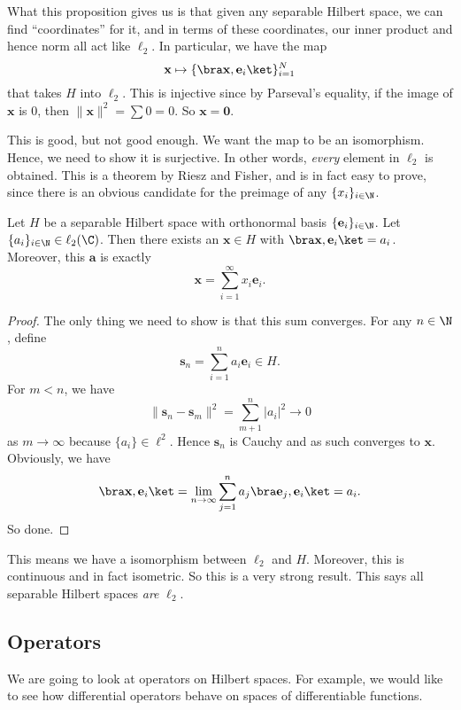 \documentclass[a4paper]{article}
\begin{document}
What this proposition gives us is that given any separable Hilbert space, we can find ``coordinates'' for it, and in terms of these coordinates, our inner product and hence norm all act like $\ell_2$. In particular, we have the map
\[
  \mathbf{x} \mapsto \{\bra \mathbf{x}, \mathbf{e}_i\ket \}_{i = 1}^N
\]
that takes $H$ into $\ell_2$. This is injective since by Parseval's equality, if the image of $\mathbf{x}$ is $0$, then $\|\mathbf{x}\|^2 = \sum 0 = 0$. So $\mathbf{x} = \mathbf{0}$.

This is good, but not good enough. We want the map to be an isomorphism. Hence, we need to show it is surjective. In other words, \emph{every} element in $\ell_2$ is obtained. This is a theorem by Riesz and Fisher, and is in fact easy to prove, since there is an obvious candidate for the preimage of any $\{x_i\}_{i \in \N}$.

\begin{prop}
  Let $H$ be a separable Hilbert space with orthonormal basis $\{\mathbf{e}_i\}_{i \in \N}$. Let $\{a_i\}_{i \in \N} \in \ell_2(\C)$. Then there exists an $\mathbf{x} \in H$ with $\bra \mathbf{x}, \mathbf{e}_i \ket = a_i$. Moreover, this $\mathbf{a}$ is exactly
  \[
    \mathbf{x} = \sum_{i = 1}^\infty x_i \mathbf{e}_i.
  \]
\end{prop}

\begin{proof}
  The only thing we need to show is that this sum converges. For any $n \in \N$, define
  \[
    \mathbf{s}_n = \sum_{i = 1}^n a_i \mathbf{e}_i \in H.
  \]
  For $m < n$, we have
  \[
    \|\mathbf{s}_n - \mathbf{s}_m\|^2 = \sum_{m + 1}^n |a_i|^2 \to 0
  \]
  as $m \to \infty$ because $\{a_i\} \in \ell^2$. Hence $\mathbf{s}_n$ is Cauchy and as such converges to $\mathbf{x}$. Obviously, we have
  \[
    \bra \mathbf{x}, \mathbf{e}_i\ket = \lim_{n \to \infty} \sum_{j = 1}^n a_j \bra \mathbf{e}_j, \mathbf{e}_i \ket = a_i.
  \]
  So done.
\end{proof}
This means we have a isomorphism between $\ell_2$ and $H$. Moreover, this is continuous and in fact isometric. So this is a very strong result. This says all separable Hilbert spaces \emph{are} $\ell_2$.
\subsection{Operators}
We are going to look at operators on Hilbert spaces. For example, we would like to see how differential operators behave on spaces of differentiable functions.
\end{document}
